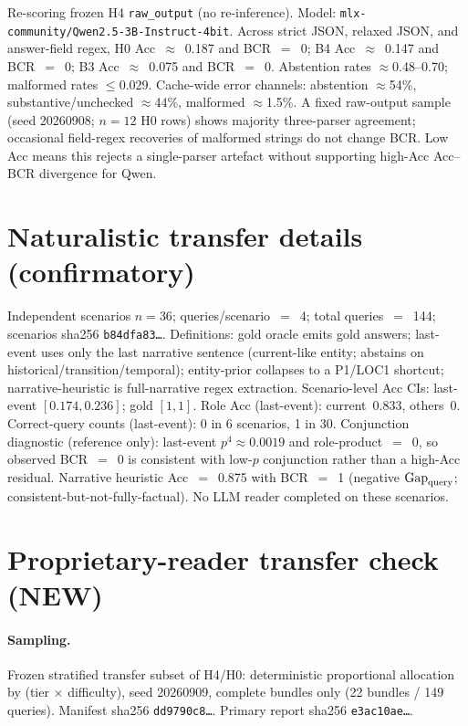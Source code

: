 Re-scoring frozen H4 \texttt{raw\_output} (no re-inference). Model: \texttt{mlx-community/Qwen2.5-3B-Instruct-4bit}. Across strict JSON, relaxed JSON, and answer-field regex, H0 Acc~$\approx$~0.187 and BCR~$=$~0; B4 Acc~$\approx$~0.147 and BCR~$=$~0; B3 Acc~$\approx$~0.075 and BCR~$=$~0. Abstention rates $\approx$0.48--0.70; malformed rates $\le$0.029. Cache-wide error channels: abstention $\approx$54\%, substantive/unchecked $\approx$44\%, malformed $\approx$1.5\%. A fixed raw-output sample (seed 20260908; $n{=}12$ H0 rows) shows majority three-parser agreement; occasional field-regex recoveries of malformed strings do not change BCR. Low Acc means this rejects a single-parser artefact without supporting high-Acc Acc--BCR divergence for Qwen.

\section{Naturalistic transfer details (confirmatory)}
\label{app:transfer}

Independent scenarios $n{=}36$; queries/scenario~$=$~4; total queries~$=$~144; scenarios sha256 \texttt{b84dfa83\ldots}. Definitions: gold oracle emits gold answers; last-event uses only the last narrative sentence (current-like entity; abstains on historical/transition/temporal); entity-prior collapses to a P1/LOC1 shortcut; narrative-heuristic is full-narrative regex extraction. Scenario-level Acc CIs: last-event $[0.174,0.236]$; gold $[1,1]$. Role Acc (last-event): current~$0.833$, others~$0$. Correct-query counts (last-event): 0 in 6 scenarios, 1 in 30. Conjunction diagnostic (reference only): last-event $p^{4}\!\approx\!0.0019$ and role-product~$=$~0, so observed BCR~$=$~0 is consistent with low-$p$ conjunction rather than a high-Acc residual. Narrative heuristic Acc~$=$~0.875 with BCR~$=$~1 (negative $\mathrm{Gap}_{\mathrm{query}}$; consistent-but-not-fully-factual). No LLM reader completed on these scenarios.

\section{Proprietary-reader transfer check (NEW)}
\label{app:prop-transfer}

\paragraph{Sampling.} Frozen stratified transfer subset of H4/H0: deterministic proportional allocation by (tier $\times$ difficulty), seed 20260909, complete bundles only (22 bundles / 149 queries). Manifest sha256 \texttt{dd9790c8\ldots}. Primary report sha256 \texttt{e3ac10ae\ldots}.

